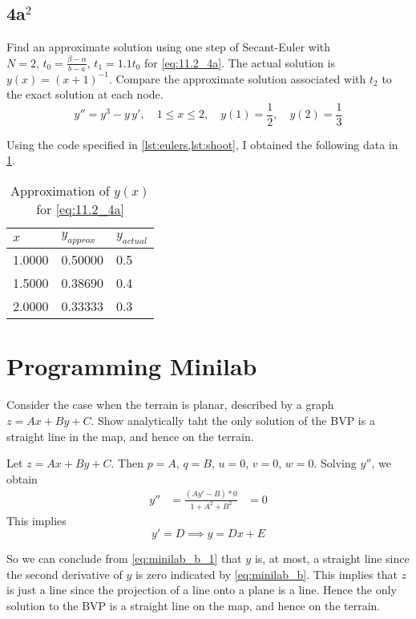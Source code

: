 \documentclass[12pt]{article}
\begin{document}
\subsection{4a$^2$}
Find an approximate solution using one step of Secant-Euler with
$N=2,\,t_0=\frac{\beta-\alpha}{b-a},\,t_1=1.1t_0$ for
\cref{eq:11.2_4a}. The actual solution is $y(x)=(x+1)^{-1}$. Compare
the approximate solution associated with $t_2$ to the exact solution
at each node.
\begin{equation}
  \label{eq:11.2_4a}
  y''=y^3-y\,y',\quad 1\leq x\leq 2,\quad y(1)=\frac{1}{2},\quad 
  y(2)=\frac{1}{3}
\end{equation}

Using the code specified in \cref{lst:eulers,lst:shoot}, I obtained the following
data in \cref{tab:4a_data}.
\begin{table}[hp]
  \centering
  \begin{tabularx}{.5\textwidth}{XXX}
    \hline
    $x$ & $y_{approx}$ & $y_{actual}$ \\
     \hline
     1.0000 &    0.50000 & 0.5 \\
     1.5000 &    0.38690 & 0.4 \\
     2.0000 &    0.33333 & 0.3 \\
    \hline           
  \end{tabularx}
  \caption{Approximation of $y(x)$ for \cref{eq:11.2_4a}}
  \label{tab:4a_data}
\end{table}

\pagebreak
\section{Programming Minilab}
Consider the case when the terrain is planar, described by a graph
$z=Ax+By+C$.  Show analytically taht the only solution of the BVP is a
straight line in the map, and hence on the terrain.

Let $z=Ax+By+C$. Then $p=A$, $q=B$, $u=0$, $v=0$, $w=0$. Solving
$y''$, we obtain
\begin{equation}
  \label{eq:minilab_b}
  \begin{aligned}
    y''&=\frac{(Ay'-B)*0}{1+A^2+B^2}
    &=0
  \end{aligned}
\end{equation}
This implies 
\begin{equation}
  \label{eq:minilab_b_1}
  y'=D \implies y=Dx+E
\end{equation}

So we can conclude from \cref{eq:minilab_b_1} that $y$ is, at most, a
straight line since the second derivative of $y$ is zero indicated by
\cref{eq:minilab_b}. This implies that $z$ is just a line since the
projection of a line onto a plane is a line. Hence the only solution
to the BVP is a straight line on the map, and hence on the terrain.
\end{document}
